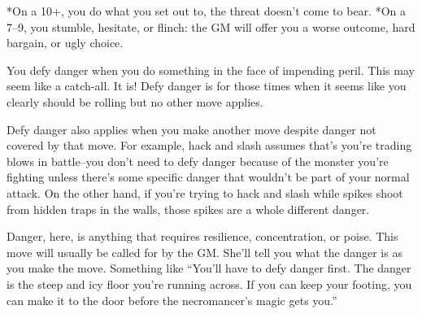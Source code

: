  *On a 10+, you do what you set out to, the threat doesn't come to bear. *On a 7--9, you stumble, hesitate, or flinch: the GM will offer you a worse outcome, hard bargain, or ugly choice.


 You defy danger when you do something in the face of impending peril. This may seem like a catch-all. It is! Defy danger is for those times when it seems like you clearly should be rolling but no other move applies.


 Defy danger also applies when you make another move despite danger not covered by that move. For example, hack and slash assumes that's you're trading blows in battle--you don't need to defy danger because of the monster you're fighting unless there's some specific danger that wouldn't be part of your normal attack. On the other hand, if you're trying to hack and slash while spikes shoot from hidden traps in the walls, those spikes are a whole different danger.


 Danger, here, is anything that requires resilience, concentration, or poise. This move will usually be called for by the GM\@. She'll tell you what the danger is as you make the move. Something like ``You'll have to defy danger first. The danger is the steep and icy floor you're running across. If you can keep your footing, you can make it to the door before the necromancer's magic gets you.''

